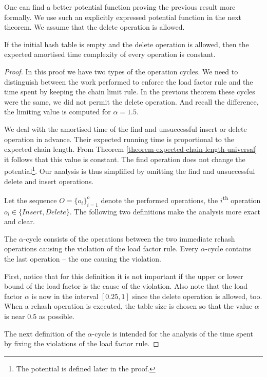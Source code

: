 One can find a better potential function proving the previous result more formally. We use such an explicitly expressed potential function in the next theorem. We assume that the delete operation is allowed.
\begin{theorem}
\label{theorem-delete-time}
If the initial hash table is empty and the delete operation is allowed, then the expected amortised time complexity of every operation is constant.
\end{theorem}
\begin{proof}
In this proof we have two types of the operation cycles. We need to distinguish between the work performed to enforce the load factor rule and the time spent by keeping the chain limit rule. In the previous theorem these cycles were the same, we did not permit the delete operation. And recall the difference, the limiting value is computed for $\alpha = 1.5$.

We deal with the amortised time of the find and unsuccessful insert or delete operation in advance. Their expected running time is proportional to the expected chain length. From Theorem \ref{theorem-expected-chain-length-universal} it follows that this value is constant. The find operation does not change the potential\footnote{The potential is defined later in the proof.}. Our analysis is thus simplified by omitting the find and unsuccessful delete and insert operations.

Let the sequence $O = \{o_i\}_{i=1}^o$ denote the performed operations, the $i$\textsuperscript{th} operation $o_i \in \lbrace Insert, Delete \rbrace$. The following two definitions make the analysis more exact and clear.

\begin{definition}
The $\alpha$-cycle consists of the operations between the two immediate rehash operations causing the violation of the load factor rule. Every $\alpha$-cycle contains the last operation -- the one causing the violation.
\end{definition}
First, notice that for this definition it is not important if the upper or lower bound of the load factor is the cause of the violation. Also note that the load factor $\alpha$ is now in the interval $\left[0.25, 1\right]$ since the delete operation is allowed, too. When a rehash operation is executed, the table size is chosen so that the value $\alpha$ is near $0.5$ as possible. 

The next definition of the $\alpha$-cycle is intended for the analysis of the time spent by fixing the violations of the load factor rule.


\end{proof}

